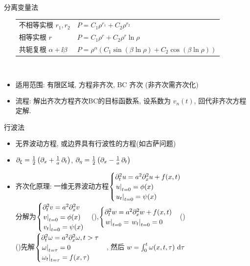 \documentclass[landscape,a4paper]{ctexart}
\begin{document}
\begin{cheatsheetcolumns}
\begin{card}{分离变量法}
\begin{itemize}
			\begin{tabular}{l|l}
				不相等实根 $r_1,r_2$        & $P=C_1\rho^{r_1}+C_2\rho^{r_2}$                                                        \\
				相等实根 $r$               & $P=C_1\rho^r+C_2\rho^r\ln\rho$                                                         \\
				共轭复根 $\alpha+\ii\beta$ & $P=\rho^\alpha\left(C_1\sin\left(\beta\ln\rho\right)+C_2\cos\left(\beta\ln\rho\right)\right)$
			\end{tabular}%
			\\
			\item 适用范围: 有限区域, 方程非齐次, BC 齐次 (非齐次需齐次化)
			\item 流程: 解出齐次方程齐次BC的目标函数系, 设系数为 $v_n(t)$, 回代非齐次方程定解.
			\end{itemize}
		\end{card}
		\begin{card}{行波法}
			\begin{itemize}
			\item 无界波动方程, 或边界具有行波性的方程(如古萨问题)
			\item $\pdif{\xi}=\frac{1}{2}\left(\pdif{x}+\frac{1}{a}\pdif{t}\right)$, $\pdif{\eta}=\frac{1}{2}\left(\pdif{x}-\frac{1}{a}\pdif{t}\right)$
			\item 齐次化原理: 一维无界波动方程$\begin{cases}\pdv[2]{u}!{t}=a^2\pdv[2]{u}!{x}+f(x,t)\\\left.u\right|_{t=0}=\phi(x)\\\left.u_t\right|_{t=0}=\psi(x)\end{cases}$\\
			分解为$\begin{cases}\pdv[2]{v}!{t}=a^2\pdv[2]{v}!{x}\\\left.v\right|_{t=0}=\phi(x)\\\left.v_t\right|_{t=0}=\psi(x)\end{cases}$(),$\begin{cases}\pdv[2]{w}!{t}=a^2\pdv[2]{w}!{x}+f(x,t)\\\left.w\right|_{t=0}=\left.w_t\right|_{t=0}=0\end{cases}$()\\
			()先解$\begin{cases}\pdv[2]{\omega}!{t}=a^2\pdv[2]{\omega}!{x},t>\tau\\\left.\omega\right|_{t=\tau}=0\\\left.\omega_t\right|_{t=\tau}=f(x,\tau)\end{cases}$, 然后 $w=\int_0^t\omega(x,t,\tau)\,\odif{\tau}$

\end{itemize}
\end{card}
\end{cheatsheetcolumns}
\end{document}
